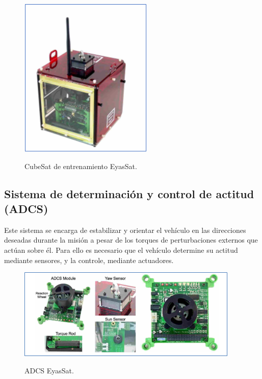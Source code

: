 \begin{figure}[!ht]
	\begin{center}
		\includegraphics[scale=0.9]{imagenes/marco_teorico/eyassat.PNG}\\
	\end{center}
	\caption{CubeSat de entrenamiento EyasSat.}
	\label{fig:eyassat}
\end{figure}

\subsection{Sistema de determinación y control de actitud (ADCS)}

Este sistema se encarga de estabilizar y orientar el vehículo en las direcciones deseadas durante la misión a pesar de los torques de perturbaciones externos que actúan sobre él. Para ello es necesario que el vehículo determine su actitud mediante sensores, y la controle, mediante actuadores.

\begin{figure}[!ht]
	\begin{center}
		\includegraphics[scale=0.9]{imagenes/marco_teorico/adcs.PNG}\\
	\end{center}
	\caption{ADCS EyasSat.}
	\label{fig:adcs}
\end{figure}

